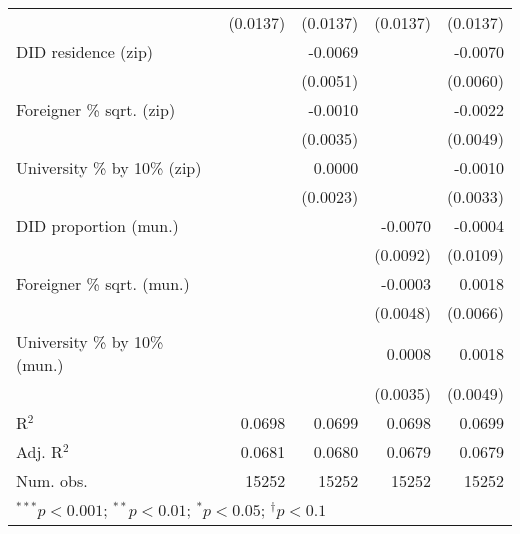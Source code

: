 \begin{tabular}{l D{.}{.}{5.11} D{.}{.}{5.11} D{.}{.}{5.11} D{.}{.}{5.11}}
                                  & (0.0137)          & (0.0137)          & (0.0137)          & (0.0137)          \\
DID residence (zip)               &                   & -0.0069           &                   & -0.0070           \\
                                  &                   & (0.0051)          &                   & (0.0060)          \\
Foreigner \% sqrt. (zip)          &                   & -0.0010           &                   & -0.0022           \\
                                  &                   & (0.0035)          &                   & (0.0049)          \\
University \% by 10\% (zip)       &                   & 0.0000            &                   & -0.0010           \\
                                  &                   & (0.0023)          &                   & (0.0033)          \\
DID proportion (mun.)             &                   &                   & -0.0070           & -0.0004           \\
                                  &                   &                   & (0.0092)          & (0.0109)          \\
Foreigner \% sqrt. (mun.)         &                   &                   & -0.0003           & 0.0018            \\
                                  &                   &                   & (0.0048)          & (0.0066)          \\
University \% by 10\% (mun.)      &                   &                   & 0.0008            & 0.0018            \\
                                  &                   &                   & (0.0035)          & (0.0049)          \\
\midrule
R$^2$                             & 0.0698            & 0.0699            & 0.0698            & 0.0699            \\
Adj. R$^2$                        & 0.0681            & 0.0680            & 0.0679            & 0.0679            \\
Num. obs.                         & 15252             & 15252             & 15252             & 15252             \\
\bottomrule
{}
\end{tabular}
